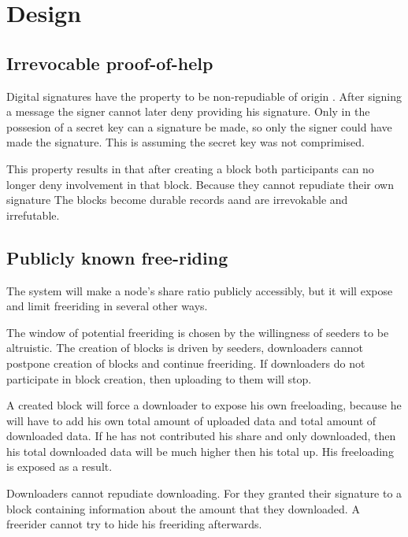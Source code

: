 \chapter{Design}






\section{Irrevocable proof-of-help}
Digital signatures have the property to be non-repudiable of origin \cite{VanderLubbe-crypto}.
After signing a message the signer cannot later deny providing his signature.
Only in the possesion of a secret key can a signature be made,
so only the signer could have made the signature.
This is assuming the secret key was not comprimised.

This property results in that after creating a block
both participants can no longer deny involvement in that block.
Because they cannot repudiate their own signature
The blocks become durable records aand are irrevokable and irrefutable.


\section{Publicly known free-riding}
The system will make a node's share ratio publicly accessibly,
but it will expose and limit freeriding in several other ways.

The window of potential freeriding is chosen by the willingness of seeders to be altruistic.
The creation of blocks is driven by seeders,
downloaders cannot postpone creation of blocks and continue freeriding.
If downloaders do not participate in block creation,
then uploading to them will stop.

A created block will force a downloader to expose his own freeloading,
because he will have to add his own total amount of uploaded data and total amount of downloaded data.
If he has not contributed his share and only downloaded,
then his total downloaded data will be much higher then his total up.
His freeloading is exposed as a result.

Downloaders cannot repudiate downloading.
For they granted their signature to a block containing information about the amount that they downloaded.
A freerider cannot try to hide his freeriding afterwards.


